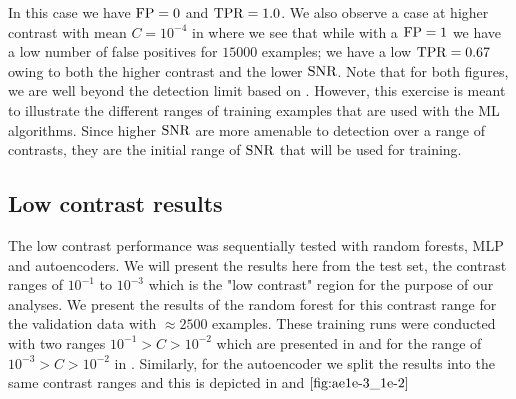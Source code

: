 In this case we have $\rm{FP}= 0$ and $\rm{TPR}=1.0$.
We also observe a case at higher contrast with mean $C=10^{-4}$ in  where we see that while with a $\rm{FP}=1$ we have a low number of false positives for $15000$ examples; we have a low $\rm{TPR}=0.67$ owing to both the higher contrast and the lower $\rm{SNR}$.
Note that for both figures, we are well beyond the detection limit based on .
However, this exercise is meant to illustrate the different ranges of training examples that are used with the ML algorithms.
Since higher $\rm{SNR}$ are more amenable to detection over a range of contrasts, they are the initial range of $\rm{SNR}$ that will be used for training.
\subsection{Low contrast results}
The low contrast performance was sequentially tested with random forests, MLP and autoencoders.
We will present the results here from the test set, the contrast ranges of $10^{-1}$ to $10^{-3}$ which is the "low contrast" region for the purpose of our analyses.
We present the results of the random forest for this contrast range for the validation data with $\approx 2500$ examples.
These training runs were conducted with two ranges $10^{-1}>C>10^{-2}$ which are presented in  and for the range of $10^{-3}>C>10^{-2}$ in .
Similarly, for the autoencoder we split the results into the same contrast ranges and this is depicted in  and $\Cref{fig:ae1e-3_1e-2}$

